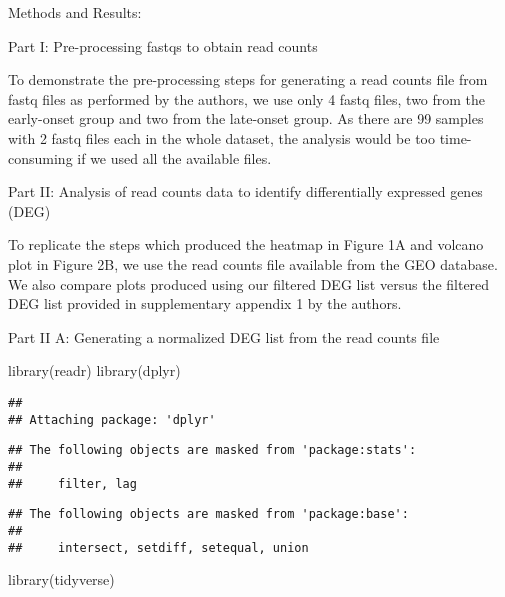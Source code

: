 \documentclass[
]{article}
\newenvironment{Shaded}{\begin{snugshade}}{\end{snugshade}}
\newcommand{\FunctionTok}[1]{\textcolor[rgb]{0.00,0.00,0.00}{#1}}
\newcommand{\NormalTok}[1]{#1}
\begin{document}
Methods and Results:

Part I: Pre-processing fastqs to obtain read counts

To demonstrate the pre-processing steps for generating a read counts
file from fastq files as performed by the authors, we use only 4 fastq
files, two from the early-onset group and two from the late-onset group.
As there are 99 samples with 2 fastq files each in the whole dataset,
the analysis would be too time-consuming if we used all the available
files.

\begin{Shaded}
\begin{Highlighting}[]

\end{Highlighting}
\end{Shaded}

Part II: Analysis of read counts data to identify differentially
expressed genes (DEG)

To replicate the steps which produced the heatmap in Figure 1A and
volcano plot in Figure 2B, we use the read counts file available from
the GEO database. We also compare plots produced using our filtered DEG
list versus the filtered DEG list provided in supplementary appendix 1
by the authors.

Part II A: Generating a normalized DEG list from the read counts file

\begin{Shaded}
\begin{Highlighting}[]
\FunctionTok{library}\NormalTok{(readr)}
\FunctionTok{library}\NormalTok{(dplyr)}
\end{Highlighting}
\end{Shaded}

\begin{verbatim}
## 
## Attaching package: 'dplyr'
\end{verbatim}

\begin{verbatim}
## The following objects are masked from 'package:stats':
## 
##     filter, lag
\end{verbatim}

\begin{verbatim}
## The following objects are masked from 'package:base':
## 
##     intersect, setdiff, setequal, union
\end{verbatim}

\begin{Shaded}
\begin{Highlighting}[]
\FunctionTok{library}\NormalTok{(tidyverse)}
\end{Highlighting}
\end{Shaded}
\end{document}
